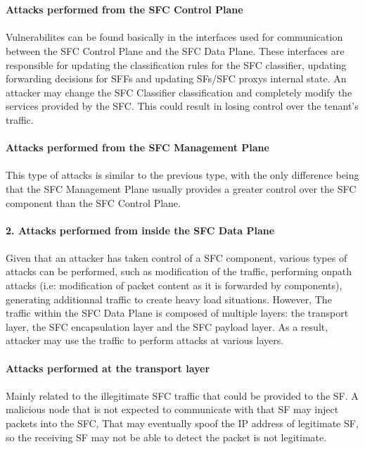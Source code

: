 \newpage
{}\\
\\
\textbf{Attacks performed from the SFC Control Plane}\\
\\
Vulnerabilites can be found basically in the interfaces used for communication between the SFC Control Plane and the SFC Data Plane. These interfaces are responsible for updating the classification rules for the SFC classifier, updating forwarding decisions for SFFs and updating SFs/SFC proxys internal state. An attacker may change the SFC Classifier classification and completely modify the services provided by the SFC. This could result in losing control over the tenant's traffic.\\
\\
\textbf{Attacks performed from the SFC Management Plane}\\
\\
This type of attacks is similar to the previous type, with the only difference being that the SFC Management Plane usually provides a greater control over the SFC component than the SFC Control Plane.\\
\\
\textbf{2. Attacks performed from inside the SFC Data Plane}\\
\\
Given that an attacker has taken control of a SFC component, various types of attacks can be performed, such as modification of the traffic, performing onpath attacks (i.e: modification of packet content as it is forwarded by components), generating additionnal traffic to create heavy load situations. However, The traffic within the SFC Data Plane is composed of multiple layers: the transport layer, the SFC encapsulation layer and the SFC payload layer. As a result, attacker may use the traffic to perform attacks at various layers.\\
\\
\textbf{Attacks performed at the transport layer}\\
\\
Mainly related to the illegitimate SFC traffic that could be provided to the SF. A malicious node that is not expected to communicate with that SF may inject packets into the SFC, That may eventually spoof the IP address of legitimate SF, so the receiving SF may not be able to detect the packet is not legitimate.\\
